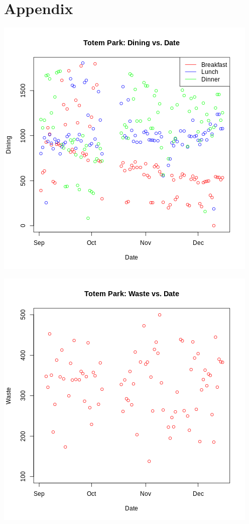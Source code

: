 \newpage
\section{Appendix}
\begin{center}
    \includegraphics[scale = 0.575]{graph_table/TP_dining.png}
\end{center}

\begin{center}
    \includegraphics[scale = 0.575]{graph_table/TP_waste.png}
\end{center}

